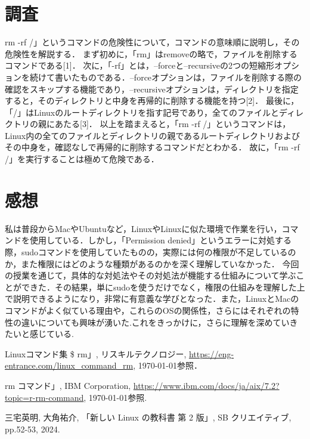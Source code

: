 \documentclass{myreport}  %
\begin{document}
\section{調査}
rm -rf /」というコマンドの危険性について，コマンドの意味順に説明し，その危険性を解説する．
まず初めに，「rm」はremoveの略で，ファイルを削除するコマンドである[1]．
次に，「-rf」とは，--forceと--recursiveの2つの短縮形オプションを続けて書いたものである．--forceオプションは，ファイルを削除する際の確認をスキップする機能であり，--recursiveオプションは，ディレクトリを指定すると，そのディレクトリと中身を再帰的に削除する機能を持つ[2]．
最後に，「/」はLinuxのルートディレクトリを指す記号であり，全てのファイルとディレクトリの親にあたる[3]．
以上を踏まえると，「rm -rf /」というコマンドは，Linux内の全てのファイルとディレクトリの親であるルートディレクトリおよびその中身を，確認なしで再帰的に削除するコマンドだとわかる．
故に，「rm -rf /」を実行することは極めて危険である．

\section{感想}
私は普段からMacやUbuntuなど，LinuxやLinuxに似た環境で作業を行い，コマンドを使用している．しかし，「Permission denied」というエラーに対処する際，sudoコマンドを使用していたものの，実際には何の権限が不足しているのか，また権限にはどのような種類があるのかを深く理解していなかった．
今回の授業を通じて，具体的な対処法やその対処法が機能する仕組みについて学ぶことができた．その結果，単にsudoを使うだけでなく，権限の仕組みを理解した上で説明できるようになり，非常に有意義な学びとなった．また，LinuxとMacのコマンドがよく似ている理由や，これらのOSの関係性，さらにはそれぞれの特性の違いについても興味が湧いた.これをきっかけに，さらに理解を深めていきたいと感じている.

\begin{thebibliography}{9}
      \item Linuxコマンド集 \$ rm」, リスキルテクノロジー, \url{https://eng-entrance.com/linux_command_rm}, \today 参照．
      \item rm コマンド」, IBM Corporation, \url{https://www.ibm.com/docs/ja/aix/7.2?topic=r-rm-command}, \today 参照.
      \item 三宅英明, 大角祐介, 「新しい Linux の教科書 第 2 版」, SB クリエイティブ, pp.52-53, 2024.
\end{thebibliography}
\end{document}
